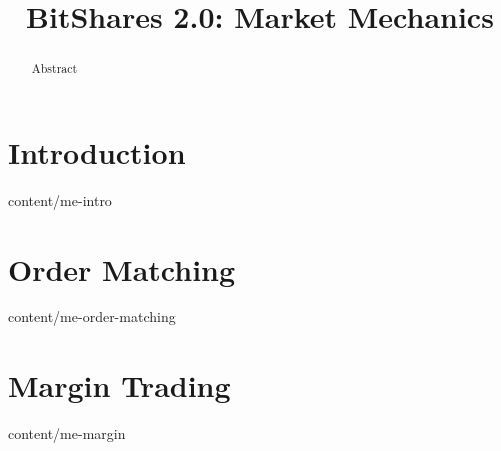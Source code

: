\documentclass[unpublished]{btswhitepaper}
\title{BitShares 2.0: Market Mechanics}
\begin{document}
\maketitle

\begin{abstract}%
Abstract
\end{abstract}

\def\SWAN{\text{SWAN}}
\def\MCR{\text{MCR}}
\def\MCP{\text{MCP}}
\def\SP{\text{SETTLE}}
\def\MSQR{\text{MSQR}}
\def\SQP{\text{SQP}}

\section       { Introduction                      }  { content/me-intro                 } 
\section       { Order Matching                    }  { content/me-order-matching        } 
\section       { Margin Trading                    }  { content/me-margin                } 



\nocite{*}
\end{document}
